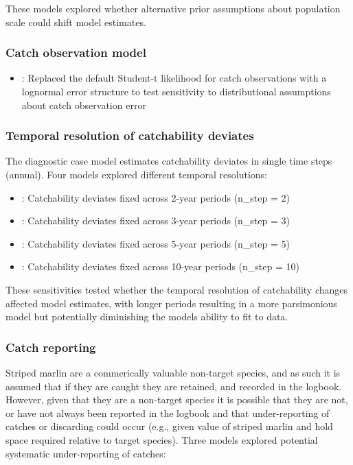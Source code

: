 \documentclass[
  11pt,
]{SCreport}
\providecommand{\tightlist}{%
  \setlength{\itemsep}{0pt}\setlength{\parskip}{0pt}}\usepackage{longtable,booktabs,array}
\begin{document}
These models explored whether alternative prior assumptions about
population scale could shift model estimates.

\subsubsection{Catch observation model}\label{sec-desc-sens-catch-obs}

\begin{itemize}
\tightlist
\item
  : Replaced the default Student-t likelihood for catch
  observations with a lognormal error structure to test sensitivity to
  distributional assumptions about catch observation error
\end{itemize}

\subsubsection{Temporal resolution of catchability
deviates}\label{sec-desc-sens-qdev}

The diagnostic case model estimates catchability deviates in single time
steps (annual). Four models explored different temporal resolutions:

\begin{itemize}
\tightlist
\item
  : Catchability deviates fixed across 2-year periods
  (n\_step = 2)
\item
  : Catchability deviates fixed across 3-year periods
  (n\_step = 3)\\
\item
  : Catchability deviates fixed across 5-year periods
  (n\_step = 5)
\item
  : Catchability deviates fixed across 10-year periods
  (n\_step = 10)
\end{itemize}

These sensitivities tested whether the temporal resolution of
catchability changes affected model estimates, with longer periods
resulting in a more parsimonious model but potentially diminishing the
models ability to fit to data.

\subsubsection{Catch reporting}\label{sec-desc-sens-catch-reporting}

Striped marlin are a commerically valuable non-target species, and as
such it is assumed that if they are caught they are retained, and
recorded in the logbook. However, given that they are a non-target
species it is possible that they are not, or have not always been
reported in the logbook and that under-reporting of catches or
discarding could occur (e.g., given value of striped marlin and hold
space required relative to target species). Three models explored
potential systematic under-reporting of catches:
\end{document}

